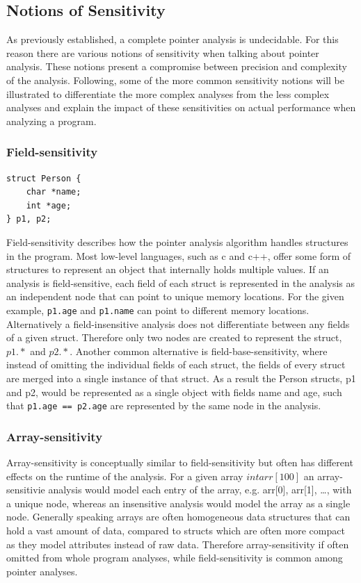 \subsection{Notions of Sensitivity}
As previously established, a complete pointer analysis is undecidable.
For this reason there are various notions of sensitivity when talking about pointer analysis.
These notions present a compromise between precision and complexity of the analysis.
Following, some of the more common sensitivity notions will be illustrated to differentiate the more complex analyses from the less complex analyses and explain the impact of these sensitivities on actual performance when analyzing a program.

\subsubsection{Field-sensitivity}
\begin{verbatim}
struct Person {
    char *name;
    int *age;
} p1, p2;
\end{verbatim}

Field-sensitivity describes how the pointer analysis algorithm handles structures in the program.
Most low-level languages, such as c and c++, offer some form of structures to represent an object that internally holds multiple values.
If an analysis is field-sensitive, each field of each struct is represented in the analysis as an independent node that can point to unique memory locations.
For the given example, \verb|p1.age| and \verb|p1.name| can point to different memory locations.
Alternatively a field-insensitive analysis does not differentiate between any fields of a given struct.
Therefore only two nodes are created to represent the struct, $p1.*$ and $p2.*$.
Another common alternative is field-base-sensitivity, where instead of omitting the individual fields of each struct, the fields of every struct are merged into a single instance of that struct.
As a result the Person structs, p1 and p2, would be represented as a single object with fields name and age, such that \verb|p1.age == p2.age| are represented by the same node in the analysis.

\subsubsection{Array-sensitivity}
Array-sensitivity is conceptually similar to field-sensitivity but often has different effects on the runtime of the analysis.
For a given array $int arr[100]$ an array-sensitivie analysis would model each entry of the array, \newline e.g. arr[0], arr[1], \dots, with a unique node, whereas an insensitive analysis would model the array as a single node.
Generally speaking arrays are often homogeneous data structures that can hold a vast amount of data, compared to structs which are often more compact as they model attributes instead of raw data.
Therefore array-sensitivity if often omitted from whole program analyses, while field-sensitivity is common among pointer analyses.

